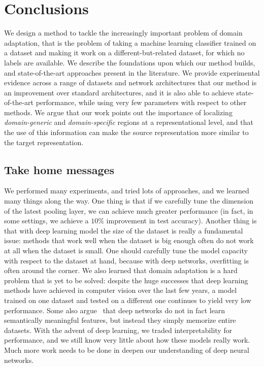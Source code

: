 \documentclass[../main.tex]{subfiles}
\begin{document}
    \chapter{Conclusions}\label{chap:summary}

    We design a method to tackle the increasingly important problem of domain adaptation,
    that is the problem of taking a machine learning classifier trained on a dataset and making it work
    on a different-but-related dataset, for which no labels are available. We describe the foundations
    upon which our method builds, and state-of-the-art approaches present in the literature. We provide
    experimental evidence across a range of datasets and network architectures that our method is an
    improvement over standard architectures, and it is also able to achieve state-of-the-art performance,
    while using very few parameters with respect to other methods. We argue that our work points out the
    importance of localizing \textit{domain-generic} and \textit{domain-specific} regions at a representational
    level, and that the use of this information can make the source representation more similar to the target
    representation.

    \section{Take home messages}
    We performed many experiments, and tried lots of approaches, and we learned many things along the way.
    One thing is that if we carefully tune the dimension of the latest pooling layer, we can achieve much
    greater performance (in fact, in some settings, we achieve a $10\%$ improvement in test accuracy).
    Another thing is that with deep learning model the size of the dataset is really a fundamental issue:
    methods that work well when the dataset is big enough often do not work at all when the dataset is
    small. One should carefully tune the model capacity with respect to the dataset at hand, because with
    deep networks, overfitting is often around the corner.
    We also learned that domain adaptation is a hard problem that is yet to be solved: despite the huge
    successes that deep learning methods have achieved in computer vision over the last few years, a model
    trained on one dataset and tested on a different one continues to yield very low performance. Some
    also argue~\cite{DBLP:journals/corr/ZhangBHRV16} that deep networks do not in fact learn semantically
    meaningful features, but instead they simply memorize entire datasets. With the advent of deep learning,
    we traded interpretability for performance, and we still know very little about how these models really work.
    Much more work needs to be done in deepen our understanding of deep neural networks.
\end{document}
